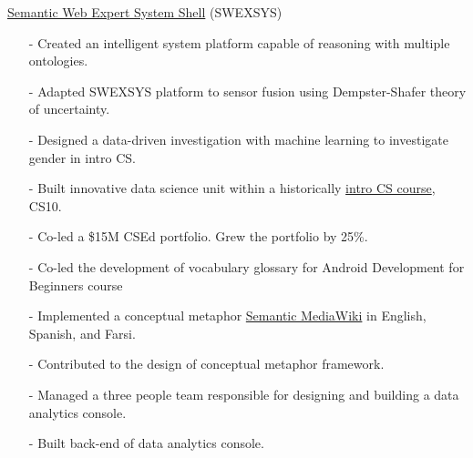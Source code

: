 \documentclass[11pt,article,oneside]{memoir}
\begin{document}
\ind \href{https://github.com/omoju/SWEXSYS}{Semantic Web Expert System Shell} (SWEXSYS)
\begin{itemize}[noitemsep,nolistsep]
\item[-] Created an intelligent system platform capable of reasoning with multiple ontologies.
\item[-] Adapted SWEXSYS platform to sensor fusion using Dempster-Shafer theory of uncertainty.
\end{itemize} 

\bigskip


\medskip

\begin{itemize}[noitemsep,nolistsep]
\item[-] Designed a data-driven investigation with machine learning to investigate gender in intro CS.
\item[-] Built innovative data science unit within a historically \href{http://www.whitehouse.gov/the-press-office/2014/12/08/fact-sheet-new-commitments-support-computer-science-education}{intro CS course}, CS10.
\end{itemize} 

\begin{itemize}[noitemsep,nolistsep]
\item[-]Co-led a \$15M CSEd portfolio. Grew the portfolio by 25\%.
\item[-]Co-led the development of vocabulary glossary for Android Development for Beginners course
\end{itemize} 

\begin{itemize}[noitemsep,nolistsep]
\item[-] Implemented a conceptual metaphor \href{http://metaphor.icsi.berkeley.edu}{Semantic MediaWiki} in English, Spanish, and Farsi.
\item[-] Contributed to the design of conceptual metaphor framework.
\end{itemize} 

\begin{itemize}[noitemsep,nolistsep]
\item[-]Managed a three people team responsible for designing and building a data analytics console.
\item[-]Built back-end of data analytics console.
\end{itemize} 
\end{document}
